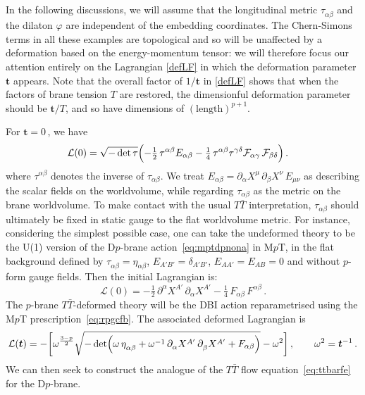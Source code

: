 \documentclass[11pt]{article}
\newcommand{\be}{\begin{equation}}
\newcommand{\ee}{\end{equation}}
\newcommand{\CL}{\mathcal{L}}
\newcommand{\p}{\partial}
\newcommand{\lambdap}{\boldsymbol{t}}
\begin{document}
In the following discussions, we will assume that the longitudinal metric $\tau^{}_{\alpha\beta}$ and the dilaton $\varphi$ are independent of the embedding coordinates. 
The Chern-Simons terms in all these examples are topological and so will be unaffected by a deformation based on the energy-momentum tensor: we will therefore focus our attention entirely on the Lagrangian \eqref{defLF} in which the deformation parameter $\lambdap$ appears.
Note that the overall factor of $1/\lambdap$ in \eqref{defLF} shows that when the factors of brane tension $T$ are restored, the dimensionful deformation parameter should be $\lambdap/T$, and so have dimensions of $(\text{length})^{p+1}$.

For $\lambdap=0$\,, we have
%
\be
\begin{split} 
\mathcal{L} (0) & = \sqrt{-\det \tau}  \Bigl(
- \tfrac{1}{2} \, \tau^{\alpha \beta} E_{\alpha \beta}  - \tfrac{1}{4}\, \tau^{\alpha \beta} \tau^{\gamma \delta} \mathcal{F}_{\alpha \gamma} \, \mathcal{F}_{\beta \delta} \Bigr)\,. 
\end{split} 
\ee
where $\tau^{\alpha \beta}$ denotes the inverse of $\tau_{\alpha \beta}$.
%
We treat $E_{\alpha \beta} = \partial_\alpha X^\mu \, \partial_\beta X^\nu \, E_{\mu\nu}$ as describing the scalar fields on the worldvolume, while regarding $\tau_{\alpha \beta}$ as the metric on the brane worldvolume.
To make contact with the usual $T\bar T$ interpretation, $\tau_{\alpha\beta}$ should ultimately be fixed in static gauge to the flat worldvolume metric.
For instance, considering the simplest possible case, one can take the undeformed theory to be the U(1) version of the D$p$-brane action~\eqref{eq:mptdpnona} in M$p$T, in the flat background defined by $\tau^{}_{\alpha \beta} = \eta^{}_{\alpha \beta}$, $E_{A'B'} = \delta_{A'B'}$, $E_{A A'} =E_{AB} = 0$ and without $p$-form gauge fields. 
Then the initial Lagrangian is:
%
\be \label{eq:undel}
    \CL(0) = - \tfrac{1}{2} \, \p^{\alpha} X^{A'} \, \p^{}_\alpha X^{A'} - \tfrac{1}{4} \, F_{\alpha \beta}\,F^{\alpha\beta}\,. 
\ee
%
The $p$-brane $T\bar{T}$-deformed theory will be the DBI action reparametrised using the M$p$T prescription~\eqref{eq:rpgcfb}. The associated deformed Lagrangian is
%
\be
    \CL(\lambdap) = - \biggl[ \omega^{\frac{3-p}{2}} \sqrt{-\det \Bigl(\omega \, \eta^{}_{\alpha\beta} + \omega^{-1} \, \p^{}_{\alpha} X^{A'} \, \p^{}_\beta X^{A'} + F_{\alpha \beta} \Bigr)} - \omega^2 \biggr]\,, 
        \qquad%
    \omega^2 = \lambdap^{-1}\,.
\label{eq:defundel}
\ee
We can then seek to construct the analogue of the $T\bar{T}$ flow equation~\eqref{eq:ttbarfe} for the D$p$-brane. 
\end{document}
